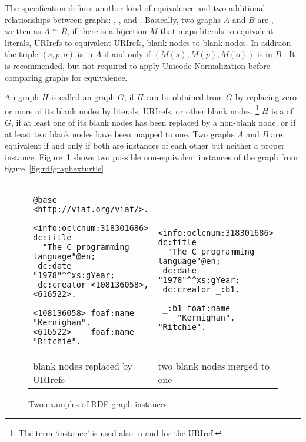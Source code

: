 The  specification defines another kind of equivalence and 
two additional relationships between  graphs: , 
, and . Basically, two  
graphs $A$ and $B$ are , written as $A \cong B$,
if there is a bijection $M$ that maps literals to equivalent literals, URIrefs 
to equivalent URIrefs, blank nodes to blank nodes. In addition the triple
$(s,p,o)$ is in $A$ if and only if $(M(s),M(p),M(o))$ is in 
$B$ \cite[sec. 6.3]{Klyne2004}. It is recommended, but not required to 
apply Unicode Normalization before comparing graphs for equivalence.

An  graph $H$ is called  an 
 graph $G$, if $H$ can be obtained from $G$ by replacing zero 
or more of its blank nodes by literals, URIrefs, or other blank nodes.%
\footnote{The term `instance' is used also in
 and  for the  URIref.} 
$H$ is a  of $G$, if at least one of its blank
nodes has been replaced by a non-blank node, or if at least two blank
nodes have been mapped to one. Two graphs $A$ and $B$ are equivalent 
if and only if both are instances of each other but neither a proper 
instance. Figure~\ref{fig:rdfgraphinstances} shows two possible
non-equivalent instances of the graph from figure~\ref{fig:rdfgraphexturtle}.

\begin{figure}
\begin{tabular}{ m{0.5\linewidth} m{0.5\linewidth} }
\begin{lstlisting}[language=turtle]
@base <http://viaf.org/viaf/>.

<info:oclcnum:318301686> dc:title 
  "The C programming language"@en;
 dc:date "1978"^^xs:gYear;
 dc:creator <108136058>, <616522>.

<108136058> foaf:name "Kernighan".
<616522>    foaf:name "Ritchie".
\end{lstlisting}
&
\begin{lstlisting}[language=turtle]


<info:oclcnum:318301686> dc:title 
  "The C programming language"@en;
 dc:date "1978"^^xs:gYear;
 dc:creator _:b1.

 _:b1 foaf:name 
    "Kernighan", "Ritchie".
\end{lstlisting}
\\
blank nodes replaced by URIrefs &
two blank nodes merged to one
\\
\end{tabular}
\caption{Two examples of RDF graph instances}
\label{fig:rdfgraphinstances}
\end{figure}

